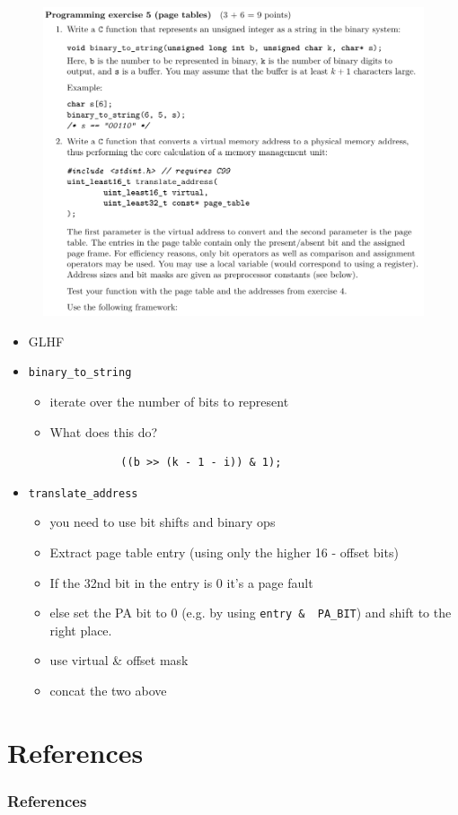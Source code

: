\documentclass[10pt]{beamer}
\begin{document}
\begin{frame}{}
        \begin{figure}
          \includegraphics[keepaspectratio, width=\textwidth, height=\textheight-2\baselineskip]{img/104_ex5.png} \\
        \end{figure}
        \framebreak
        \begin{itemize}
         \item GLHF
         \item  \texttt{binary_to_string}
         \begin{itemize}
          \item iterate over the number of bits to represent
          \item What does this do? 
          \begin{verbatim}
           ((b >> (k - 1 - i)) & 1);
          \end{verbatim}
        \end{itemize}
        \item \texttt{translate_address}
        \begin{itemize}
        \item you need to use bit shifts and binary ops
        \item Extract page table entry (using only the higher 16 - offset bits)
        \item If the 32nd bit in the entry is 0 it's a page fault
        \item else set the PA bit to 0 (e.g. by using \texttt{entry & ~PA_BIT}) and shift to the right place. 
        \item use virtual \& offset mask
        \item concat the two above 
        \end{itemize}
        \end{itemize}
\end{frame}

\section{References}
    \begin{frame}[allowframebreaks]
      \frametitle{References}
      \begin{tiny}
      \nocite{*}
      \printbibliography
      \end{tiny}
    \end{frame}
\end{document}
